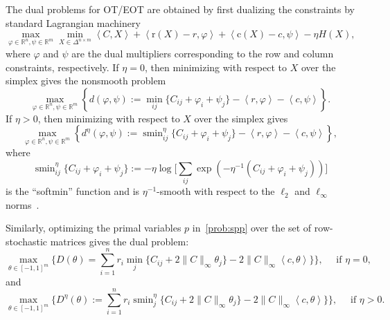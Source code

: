 \documentclass[10pt]{article}
\newcommand{\R}{\mathbb{R}}
\newcommand{\softmin}{\operatorname{smin}}
\newcommand{\inner}[2]{\left\langle #1,#2\right\rangle}
\theoremstyle{plain}
\theoremstyle{definition}
\theoremstyle{remark}
\newcommand{\col}{\bm{\mathrm{c}}}
\newcommand{\row}{\bm{\mathrm{r}}}
\begin{document}
The dual problems for OT/EOT are obtained by first dualizing the constraints by standard Lagrangian machinery
\begin{equation}\label{prob:lagrange_ot}
    \max_{\varphi\in\R^n,\psi\in\R^m}\min_{X\in\Delta^{n\times m}}\inner{C}{X}+\inner{\row(X)-r}{\varphi} + \inner{\col(X)-c}{\psi} -\eta  H(X),
\end{equation}
where $\varphi$ and $\psi$ are the dual multipliers corresponding to the row and column constraints, respectively. If $\eta =0$, then minimizing with respect to $X$ over the simplex gives the nonsmooth problem
\begin{equation}\label{prob:dual_ot}
   \max_{\varphi\in\R^n,\psi\in\R^m}\left\{d(\varphi,\psi):=\min_{ij}\{C_{ij}+\varphi_i+\psi_j\}-\inner{r}{\varphi} - \inner{c}{\psi}\right\}.
\end{equation}
If $\eta >0$,  then minimizing with respect to $X$ over the simplex gives
\begin{equation}\label{def:dual_eot}
    \max_{\varphi\in\R^n,\psi\in\R^m} \left\{d^{\eta }(\varphi,\psi):=\softmin^{\eta }_{ij}\{C_{ij}+\varphi_i+\psi_j\}-\inner{r}{\varphi} - \inner{c}{\psi}\right\},
\end{equation}
where \[\softmin^{\eta }_{ij}\{C_{ij}+\varphi_i+\psi_j\}:=-\eta \log\biggl[\sum_{ij}\exp(-\eta ^{-1}(C_{ij}+\varphi_i+\psi_j))\biggr]\]
is the ``softmin'' function and is $\eta ^{-1}$-smooth with respect to the $\ell_2$ and $\ell_\infty$ norms~\cite[Example 5.15]{beckFirstOrderMethodsOptimization2017}.

Similarly, optimizing the primal variables $p$ in~\eqref{prob:spp} over the set of row-stochastic matrices gives the dual problem:
\begin{equation}\label{def:dual_spp}
    \max_{\theta\in[-1,1]^m}\biggl\{D(\theta)=\sum_{i=1}^nr_i\min_j\{C_{ij}+2\|C\|_\infty\theta_j\}-2\|C\|_\infty\inner{c}{\theta}\}\biggr\}, \quad \mbox{ if }  \eta =0, 
\end{equation}
 and 
\begin{equation}\label{def:dual_spp_e}
    \max_{\theta\in[-1,1]^m}\biggl\{D^{\eta }(\theta):=\sum_{i=1}^nr_i\softmin^{\eta }_j\{C_{ij}+2\|C\|_\infty\theta_j\}-2\|C\|_\infty\inner{c}{\theta}\}\biggr\}, \quad \mbox{ if }  \eta >0.
\end{equation}
\end{document}
